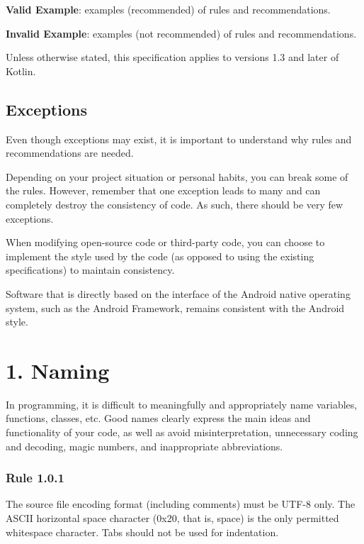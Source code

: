 \textbf{Valid Example}: examples (recommended) of rules and recommendations.



\textbf{Invalid Example}: examples (not recommended) of rules and recommendations.



Unless otherwise stated, this specification applies to versions 1.3 and later of Kotlin.



\subsection*{\textbf{Exceptions}}



Even though exceptions may exist, it is important to understand why rules and recommendations are needed.

Depending on your project situation or personal habits, you can break some of the rules. However, remember that one exception leads to many and can completely destroy the consistency of code. As such, there should be very few exceptions.

When modifying open-source code or third-party code, you can choose to implement the style used by the code (as opposed to using the existing specifications) to maintain consistency.

Software that is directly based on the interface of the Android native operating system, such as the Android Framework, remains consistent with the Android style.

\section*{\textbf{1. Naming}}

In programming, it is difficult to meaningfully and appropriately name variables, functions, classes, etc. Good names clearly express the main ideas and functionality of your code, as well as avoid misinterpretation, unnecessary coding and decoding, magic numbers, and inappropriate abbreviations.



\subsubsection*{\textbf{Rule 1.0.1}}
\leavevmode\newline

The source file encoding format (including comments) must be UTF-8 only. The ASCII horizontal space character (0x20, that is, space) is the only permitted whitespace character. Tabs should not be used for indentation.



